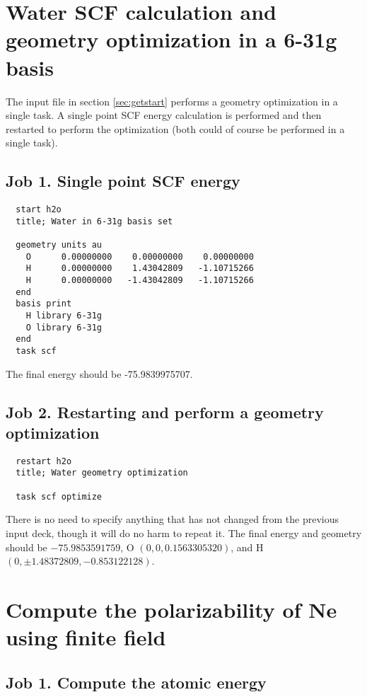 \label{sec:sample}
\section{Water SCF calculation and geometry optimization in a 6-31g basis}
\label{sec:sample1}

The input file in section \ref{sec:getstart} performs a geometry optimization
in a single task. A single point SCF energy calculation is performed and then
restarted to perform the optimization (both could of course be
performed in a single task).

\subsection{Job 1.  Single point SCF energy}

\begin{verbatim}
  start h2o
  title; Water in 6-31g basis set

  geometry units au
    O      0.00000000    0.00000000    0.00000000
    H      0.00000000    1.43042809   -1.10715266
    H      0.00000000   -1.43042809   -1.10715266
  end
  basis print
    H library 6-31g
    O library 6-31g
  end
  task scf
\end{verbatim}

The final energy should be -75.9839975707.

\subsection{Job 2. Restarting and perform a geometry optimization}

\begin{verbatim}
  restart h2o
  title; Water geometry optimization

  task scf optimize
\end{verbatim}

There is no need to specify anything that has not changed from the
previous input deck, though it will do no harm to repeat it.  The
final energy and geometry should be $-75.9853591759$, O
$(0,0,0.1563305320)$, and H $(0, \pm1.48372809, -0.853122128)$.

\section{Compute the polarizability of Ne using finite field}
\label{sec:sample2}

\subsection{Job 1. Compute the atomic energy}

